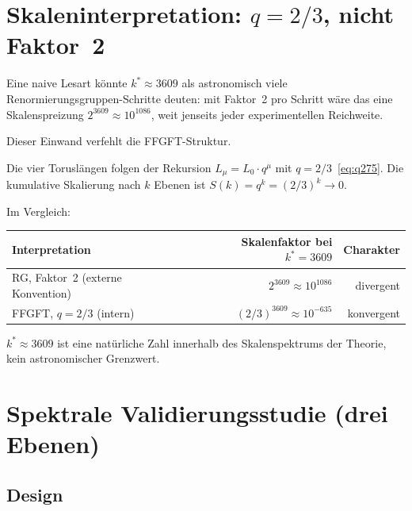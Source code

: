 \section{Skaleninterpretation: $q=2/3$, nicht Faktor~2}

\begin{remark}\label{bem:skala275}
Eine naive Lesart könnte $k^* \approx 3609$ als astronomisch viele
Renormierungsgruppen-Schritte deuten: mit Faktor~2 pro Schritt wäre das eine
Skalenspreizung $2^{3609} \approx 10^{1086}$, weit jenseits jeder
experimentellen Reichweite.

Dieser Einwand verfehlt die FFGFT-Struktur.
\end{remark}

Die vier Toruslängen folgen der Rekursion $L_\mu = L_0\cdot q^\mu$
mit $q = 2/3$~\eqref{eq:q275}. Die kumulative Skalierung nach $k$ Ebenen ist
$S(k) = q^k = (2/3)^k \to 0$.

\begin{proposition}\label{prop:konv275}
Im Vergleich:
\begin{center}
\begin{tabular}{@{}lrr@{}}
\toprule
Interpretation & Skalenfaktor bei $k^*=3609$ & Charakter \\
\midrule
RG, Faktor~2 (externe Konvention) & $2^{3609}\approx 10^{1086}$ & divergent \\
FFGFT, $q=2/3$ (intern)           & $(2/3)^{3609}\approx 10^{-635}$ & konvergent \\
\bottomrule
\end{tabular}
\end{center}
$k^* \approx 3609$ ist eine natürliche Zahl innerhalb des Skalenspektrums
der Theorie, kein astronomischer Grenzwert.
\end{proposition}

\section{Spektrale Validierungsstudie (drei Ebenen)}

\subsection{Design}

